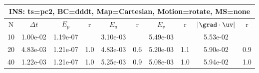 
\begin{tabular}{|c|c|c|c|c|c|c|c|c|c|} \hline
 \multicolumn{10}{|c|}{INS: ts=pc2, BC=dddt, Map=Cartesian, Motion=rotate, MS=none } \\ \hline 
     N  &   $\Delta t$ & $E_p$   &  r  &   $E_u$   &   r    &   $E_v$   & r   &  $|\grad\cdot\uv|$  & r   \\ \hline 
  10   &  1.00e-02  &   1.19e-07  &        &   3.10e-03  &        &   5.49e-03  &        &   5.53e-02  &        \\ 
  20   &  4.83e-03  &   1.21e-07  & 1.0  &   4.83e-03  & 0.6  &   5.20e-03  & 1.1  &   5.90e-02  & 0.9  \\ 
  40   &  1.22e-03  &   1.21e-07  & 1.0  &   5.25e-03  & 0.9  &   5.08e-03  & 1.0  &   5.94e-02  & 1.0  \\ 
 \hline 
\end{tabular}
